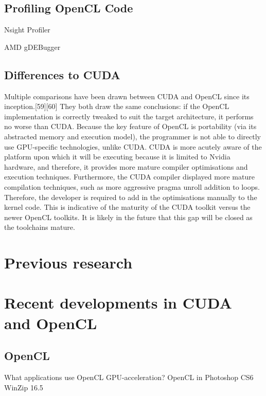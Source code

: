 \subsection{Profiling OpenCL Code}

Nsight Profiler

AMD gDEBugger

\subsection{Differences to CUDA}



Multiple comparisons have been drawn between CUDA and OpenCL since its inception.[59][60] They both draw the same conclusions: if the OpenCL implementation is correctly tweaked to suit the target architecture, it performs no worse than CUDA. Because the key feature of OpenCL is portability (via its abstracted memory and execution model), the programmer is not able to directly use GPU-specific technologies, unlike CUDA. CUDA is more acutely aware of the platform upon which it will be executing because it is limited to Nvidia hardware, and therefore, it provides more mature compiler optimisations and execution techniques. Furthermore, the CUDA compiler displayed more mature compilation techniques, such as more aggressive pragma unroll addition to loops. Therefore, the developer is required to add in the optimisations manually to the kernel code. This is indicative of the maturity of the CUDA toolkit versus the newer OpenCL toolkits. It is likely in the future that this gap will be closed as the toolchains mature.

\section{Previous research}



\section{Recent developments in CUDA and OpenCL}
\subsection{OpenCL}

What applications use OpenCL GPU-acceleration?
OpenCL in Photoshop CS6
WinZip 16.5

